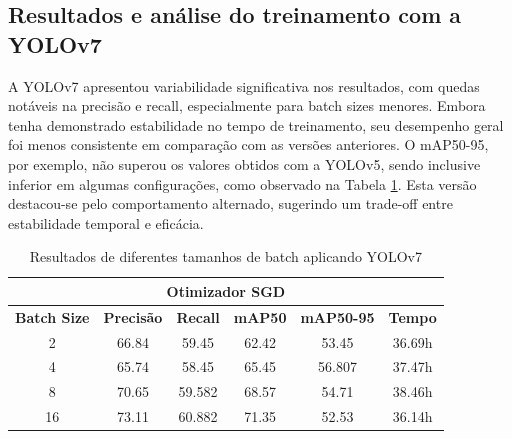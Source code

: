 \subsection{Resultados e análise do treinamento com a YOLOv7}

A YOLOv7 apresentou variabilidade significativa nos resultados, com quedas notáveis na precisão e recall, especialmente para batch sizes menores. Embora tenha demonstrado estabilidade no tempo de treinamento, seu desempenho geral foi menos consistente em comparação com as versões anteriores. O mAP50-95, por exemplo, não superou os valores obtidos com a YOLOv5, sendo inclusive inferior em algumas configurações, como observado na Tabela \ref{tab:yolov7-teste}. Esta versão destacou-se pelo comportamento alternado, sugerindo um trade-off entre estabilidade temporal e eficácia.

\begin{table}[!hbt]
    \centering
    \begin{tabular}{|c|c|c|c|c|c|}
    \hline
    \multicolumn{6}{|c|}{\textbf{Otimizador SGD}} \\ \hline
    \textbf{Batch Size} & \textbf{Precisão} & \textbf{Recall} & \textbf{mAP50} & \textbf{mAP50-95} & \textbf{Tempo} \\ \hline
    2                   & 66.84                 & 59.45              & 62.42              & 53.45                 & 36.69h             \\ \hline
    4                   & 65.74                & 58.45               & 65.45            & 56.807                & 37.47h             \\ \hline
    8                   & 70.65                 & 59.582               & 68.57             & 54.71               & 38.46h             \\ \hline
    16                  & 73.11                 & 60.882               & 71.35               & 52.53                & 36.14h            \\ \hline
    \end{tabular}
    \caption{Resultados de diferentes tamanhos de batch aplicando YOLOv7}
    \label{tab:yolov7-teste}
\end{table}

